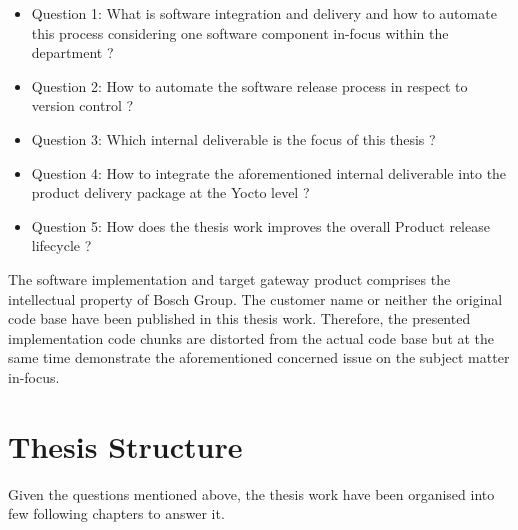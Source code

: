 \vspace{0.2cm}
\begin{itemize}

\item {Question 1: What is software integration and delivery and how to automate this process considering one software component in-focus within the department ?}
\item {Question 2: How to automate the software release process in respect to version control ?}
\item {Question 3: Which internal deliverable is the focus of this thesis ?}
\item {Question 4: How to integrate the aforementioned internal deliverable into the product delivery package at the Yocto level ?}
\item {Question 5: How does the thesis work improves the overall Product release lifecycle ?}
\end{itemize}

\noindent{}  \hspace{0.5cm}The software implementation and target gateway product comprises the intellectual property of Bosch Group. The customer name or neither the original code base have been published in this thesis work. Therefore, the presented implementation code chunks are distorted from the actual code base but at the same time demonstrate the aforementioned concerned issue on the subject matter in-focus.


\section{Thesis Structure}

Given the questions mentioned above, the thesis work have been organised into few following chapters to answer it.

